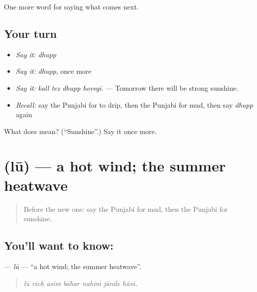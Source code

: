 \begin{grammarlens}[title={What you've built}]
One more word for saying what comes next.
\end{grammarlens}

\subsection*{Your turn}
\begin{itemize}
\raggedright
  \item \emph{Say it:} \emph{dhupp}
  \item \emph{Say it:} \emph{dhupp}, once more
  \item \emph{Say it:} \emph{kall tez dhupp hovegī.} — Tomorrow there will be strong sunshine.
  \item \emph{Recall:} say the Punjabi for to drip, then the Punjabi for mud, then say \emph{dhupp} again
\end{itemize}

\begin{tcolorbox}[breakable,colback=teal!4,colframe=teal!35!black,title={Before you move on}]
What does  mean? (\textquotedblleft{}Sunshine\textquotedblright{}.) Say it once more.
\end{tcolorbox}
\section[\texorpdfstring{\pa{ਲੂ} (lū)}{ਲੂ (lū)}]{ (lū) — a hot wind; the summer heatwave}

\label{lesson:PA-C288-lu}



\begin{quote}
Before the new one: say the Punjabi for mud, then the Punjabi for sunshine.
\end{quote}

\subsection*{You'll want to know: }
\textbf{} — \emph{lū} — \textquotedblleft{}a hot wind; the summer heatwave\textquotedblright{}.

\begin{quote}
      
\end{quote}

\begin{quote}
\emph{lū vich asīṁ bāhar nahīṁ jānde hāṁ.}
\end{quote}

